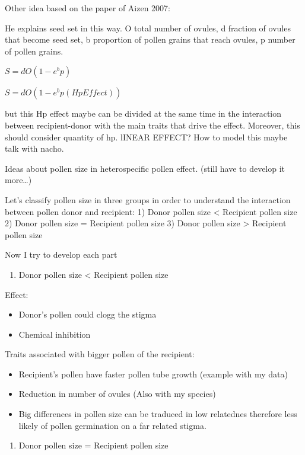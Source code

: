 \documentclass[11pt,a4paper]{article}
\providecommand{\tightlist}{%
  \setlength{\itemsep}{0pt}\setlength{\parskip}{0pt}}
\begin{document}
Other idea based on the paper of Aizen 2007:

He explains seed set in this way. O total number of ovules, d fraction
of ovules that become seed set, b proportion of pollen grains that reach
ovules, p number of pollen grains.

\(S=dO(1-e^bp)\)

\(S=dO(1-e^bp(HpEffect))\)

but this Hp effect maybe can be divided at the same time in the
interaction between recipient-donor with the main traits that drive the
effect. Moreover, this should consider quantity of hp. lINEAR EFFECT?
How to model this maybe talk with nacho.

Ideas about pollen size in heterospecific pollen effect. (still have to
develop it more\ldots{})

Let's classify pollen size in three groups in order to understand the
interaction between pollen donor and recipient: 1) Donor pollen size
\textless{} Recipient pollen size 2) Donor pollen size = Recipient
pollen size 3) Donor pollen size \textgreater{} Recipient pollen size

Now I try to develop each part

\begin{enumerate}
\def\labelenumi{\arabic{enumi})}
\tightlist
\item
  Donor pollen size \textless{} Recipient pollen size
\end{enumerate}

Effect:

\begin{itemize}
\item
  Donor's pollen could clogg the stigma
\item
  Chemical inhibition
\end{itemize}

Traits associated with bigger pollen of the recipient:

\begin{itemize}
\item
  Recipient's pollen have faster pollen tube growth (example with my
  data)
\item
  Reduction in number of ovules (Also with my species)
\item
  Big differences in pollen size can be traduced in low relatednes
  therefore less likely of pollen germination on a far related stigma.
\end{itemize}

\begin{enumerate}
\def\labelenumi{\arabic{enumi})}
\setcounter{enumi}{1}
\tightlist
\item
  Donor pollen size = Recipient pollen size
\end{enumerate}
\end{document}
